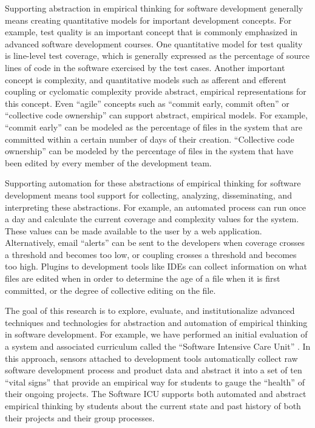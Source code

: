 Supporting abstraction in empirical thinking for software development
generally means creating quantitative models for important development
concepts.  For example, test quality is an important concept that is
commonly emphasized in advanced software development courses.  One
quantitative model for test quality is line-level test coverage, which is
generally expressed as the percentage of source lines of code in the
software exercised by the test cases.  Another important concept is
complexity, and quantitative models such as afferent and efferent coupling
or cyclomatic complexity provide abstract, empirical representations
for this concept.  Even ``agile'' concepts such as ``commit early, commit
often'' or ``collective code ownership'' can support abstract, empirical
models. For example, ``commit early'' can be modeled as the percentage of
files in the system that are committed within a certain number of days of
their creation.  ``Collective code ownership'' can be modeled by the
percentage of files in the system that have been edited by every member of
the development team.

Supporting automation for these abstractions of empirical thinking for
software development means tool support for collecting, analyzing,
disseminating, and interpreting these abstractions.  For example, an
automated process can run once a day and calculate the current coverage and
complexity values for the system.  These values can be made available to
the user by a web application. Alternatively, email ``alerts'' can be sent
to the developers when coverage crosses a threshold and becomes too low, or
coupling crosses a threshold and becomes too high.  Plugins to development
tools like IDEs can collect information on what files are edited when in
order to determine the age of a file when it is first committed, or the
degree of collective editing on the file.

The goal of this research is to explore, evaluate, and institutionalize
advanced techniques and technologies for abstraction and automation of
empirical thinking in software development.  For example, we have performed
an initial evaluation of a system and associated curriculum called the
``Software Intensive Care Unit'' \citep{csdl2-09-02}.  In this approach,
sensors attached to development tools automatically collect raw software
development process and product data and abstract it into a set of ten
``vital signs'' that provide an empirical way for students to gauge the
``health'' of their ongoing projects.  The Software ICU supports both
automated and abstract empirical thinking by students about the current
state and past history of both their projects and their group processes.

